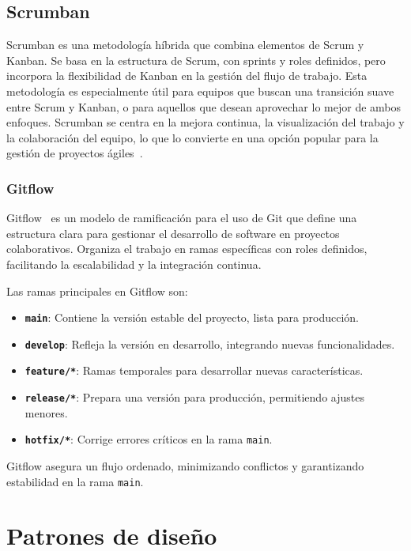 \subsection{Scrumban}
Scrumban es una metodología híbrida que combina elementos de Scrum y Kanban.
Se basa en la estructura de Scrum, con sprints y roles definidos, pero incorpora la flexibilidad de Kanban
en la gestión del flujo de trabajo.
Esta metodología es especialmente útil para equipos que buscan una transición suave entre Scrum y Kanban,
o para aquellos que desean aprovechar lo mejor de ambos enfoques.
Scrumban se centra en la mejora continua, la visualización del trabajo y la colaboración del equipo,
lo que lo convierte en una opción popular para la gestión de proyectos ágiles~\cite{web:scrumban}.

\subsubsection{Gitflow}

Gitflow~\cite{web:Gitflow} es un modelo de ramificación para el uso de Git que define una 
estructura clara para gestionar el desarrollo de software en proyectos colaborativos. 
Organiza el trabajo en ramas específicas con roles definidos, 
facilitando la escalabilidad y la integración continua.

Las ramas principales en Gitflow son:
\begin{itemize}
    \item \textbf{\texttt{main}}: Contiene la versión estable del proyecto, lista para producción.
    \item \textbf{\texttt{develop}}: Refleja la versión en desarrollo, integrando nuevas funcionalidades.
    \item \textbf{\texttt{feature/*}}: Ramas temporales para desarrollar nuevas características.
    \item \textbf{\texttt{release/*}}: Prepara una versión para producción, permitiendo ajustes menores.
    \item \textbf{\texttt{hotfix/*}}: Corrige errores críticos en la rama \texttt{main}.
\end{itemize}

Gitflow asegura un flujo ordenado, minimizando conflictos y garantizando estabilidad en la rama \texttt{main}.

\section{Patrones de diseño}
